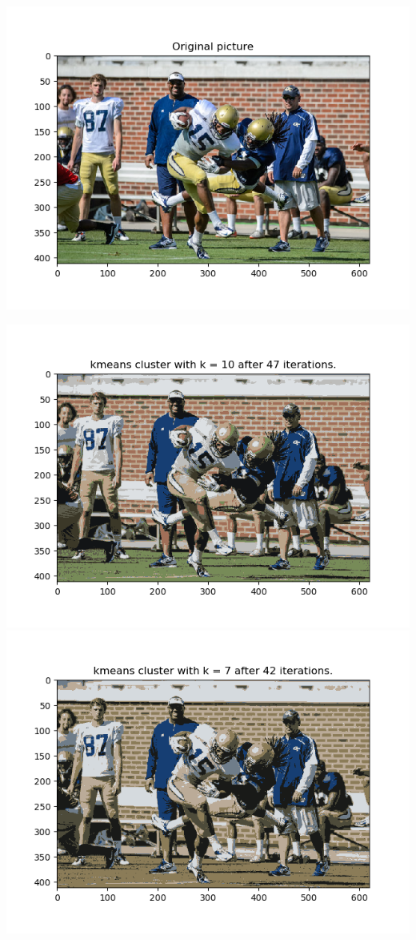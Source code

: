 \documentclass[twoside,10pt]{article}
\begin{document}
\begin{tcolorbox}
\begin{enumerate}
\begin{center}
        \includegraphics[scale = 0.5]{images/football.png}
        \end{center}
    \begin{center}\includegraphics[scale=0.45]{images/kmeans1.png}\includegraphics[scale=0.45]{images/kmeans2.png}\end{center}
\end{enumerate}
\end{tcolorbox}
\end{document}
